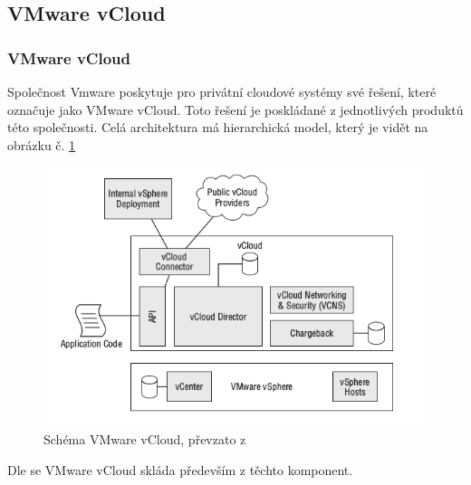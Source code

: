 \subsection{VMware vCloud}

\subsubsection{VMware vCloud}

Společnost Vmware poskytuje pro privátní cloudové systémy své řešení, které označuje jako VMware vCloud. Toto řešení je poskládané z jednotlivých produktů této společnosti. Celá architektura má hierarchická model, který je vidět na obrázku č. \ref{fig:vmware}

\begin{figure}[h]
\begin{centering}
\includegraphics[scale=0.65]{images/vmware}
\par\end{centering}
\caption{Schéma VMware vCloud, převzato z \cite{vmware}\label{fig:vmware}}
\end{figure}

Dle \cite{vmware} se VMware vCloud skláda především z těchto komponent.

